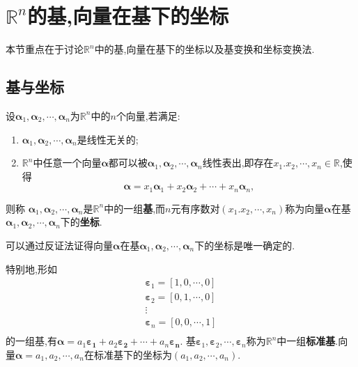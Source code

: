 \documentclass[9pt,a4paper]{book}
\begin{document}
\section{$ \mathbb{R}^n $的基,向量在基下的坐标}
本节重点在于讨论$ \mathbb{R}^n $中的基,向量在基下的坐标以及基变换和坐标变换法.
\subsection{基与坐标}
\begin{defination}[基与坐标的定义]
	设$\bm{\alpha}_1,\bm{\alpha}_2,\cdots,\bm{\alpha}_n $为$ \mathbb{R}^n $中的$ n $个向量,若满足:
	\begin{enumerate}
		\item $\bm{\alpha}_1,\bm{\alpha}_2,\cdots,\bm{\alpha}_n $是线性无关的;
		\item $ \mathbb{R}^n $中任意一个向量$ \bm{\alpha} $都可以被$\bm{\alpha}_1,\bm{\alpha}_2,\cdots,\bm{\alpha}_n $线性表出,即存在$ x_1.x_2,\cdots,x_n\in \mathbb{R} $,使得\[ \bm{\alpha}=x_1\bm{\alpha}_1+x_2\bm{\alpha}_2+\cdots+x_n\bm{\alpha}_n  ,\]
	\end{enumerate}
则称 $\bm{\alpha}_1,\bm{\alpha}_2,\cdots,\bm{\alpha}_n  $是$ \mathbb{R}^n $中的一组\textbf{基},而$ n $元有序数对$ (x_1.x_2,\cdots,x_n) $称为向量$ \bm{\alpha} $在基$\bm{\alpha}_1,\bm{\alpha}_2,\cdots,\bm{\alpha}_n $下的\textbf{坐标}.

可以通过反证法证得向量$ \bm{\alpha} $在基$\bm{\alpha}_1,\bm{\alpha}_2,\cdots,\bm{\alpha}_n $下的坐标是唯一确定的.

特别地,形如\[ \begin{array}{c}
\bm{\varepsilon}_1=[1,0,\cdots,0]\\
\bm{\varepsilon}_2=[0,1,\cdots,0]\\
\vdots\\
\bm{\varepsilon}_n=[0,0,\cdots,1]\\
\end{array} \]的一组基,有$ \bm{\alpha}=a_1\bm{\varepsilon_1}+a_2\bm{\varepsilon_2}+\cdots+a_n\bm{\varepsilon_n} $.
基$ \bm{\varepsilon}_1,\bm{\varepsilon}_2,\cdots,\bm{\varepsilon}_n $称为$ \mathbb{R}^n $中一组\textbf{标准基}.向量$ \bm{\alpha}=a_1,a_2,\cdots,a_n $在标准基下的坐标为$ (a_1,a_2,\cdots,a_n) .$
\end{defination}
\end{document}
